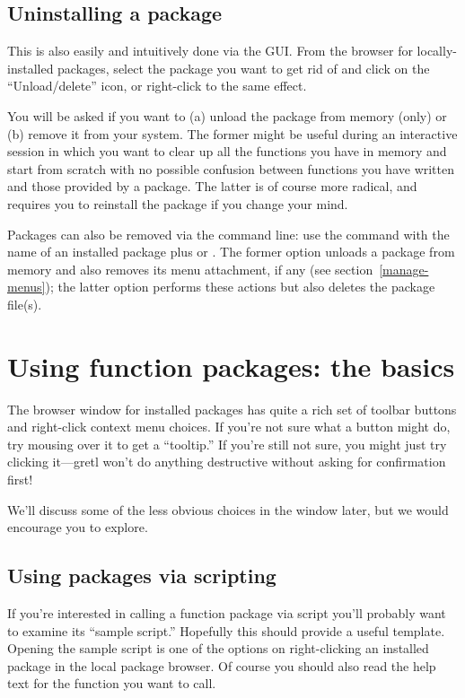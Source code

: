 \documentclass[oneside]{book}
\begin{document}
\subsection{Uninstalling a package}

This is also easily and intuitively done via the GUI. From the
browser for locally-installed packages, select the package you want to
get rid of and click on the ``Unload/delete'' icon, or right-click to
the same effect.

You will be asked if you want to (a) unload the package from memory
(only) or (b) remove it from your system. The former might be useful
during an interactive session in which you want to clear up all the
functions you have in memory and start from scratch with no possible
confusion between functions you have written and those provided by a
package. The latter is of course more radical, and requires you to
reinstall the package if you change your mind.

Packages can also be removed via the command line: use the 
command with the name of an installed package plus  or
. The former option unloads a package from memory and
also removes its menu attachment, if any (see
section~\ref{manage-menus}); the latter option performs these actions
but also deletes the package file(s).


\section{Using function packages: the basics}

The browser window for installed packages has quite a rich set of
toolbar buttons and right-click context menu choices. If you're not
sure what a button might do, try mousing over it to get a ``tooltip.''
If you're still not sure, you might just try clicking it---gretl won't
do anything destructive without asking for confirmation first!

We'll discuss some of the less obvious choices in the window later,
but we would encourage you to explore.

\subsection{Using packages via scripting}

If you're interested in calling a function package via script you'll
probably want to examine its ``sample script.'' Hopefully this should
provide a useful template. Opening the sample script is one of the
options on right-clicking an installed package in the local package
browser.  Of course you should also read the help text for the
function you want to call.
\end{document}
